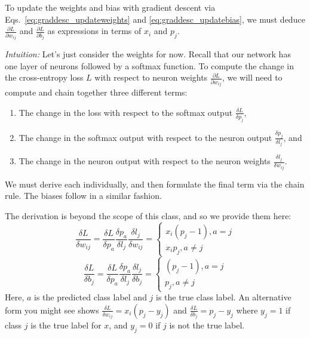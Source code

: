 \documentclass{csci1430}
\begin{document}
To update the weights and bias with gradient descent via Eqs.~\ref{eq:graddesc_updateweights} and \ref{eq:graddesc_updatebias}, we must deduce $\frac{\partial L}{\partial w_{ij}}$ and $\frac{\partial L}{\partial b_j}$ as expressions in terms of $x_i$ and $p_j$.

\emph{Intuition:} Let's just consider the weights for now. Recall that our network has one layer of neurons followed by a softmax function. To compute the change in the cross-entropy loss $L$ with respect to neuron weights $\frac{\partial L}{\partial w_{ij}}$, we will need to compute and chain together three different terms:
\begin{enumerate}
\itemsep0em
\listparindent0em
\topsep0em
\parsep0em
\partopsep0em
\item The change in the loss with respect to the softmax output $\frac{\delta L}{\delta p_j}$,
\item The change in the softmax output with respect to the neuron output $\frac{\delta p_j}{\delta l_j}$, and
\item The change in the neuron output with respect to the neuron weights $\frac{\delta l_j}{\delta w_{ij}}$.
\end{enumerate}
We must derive each individually, and then formulate the final term via the chain rule. The biases follow in a similar fashion.

The derivation is beyond the scope of this class, and so we provide them here:
\begin{equation}
\frac{\delta L}{\delta w_{ij}} = \frac{\delta L}{\delta p_a} \frac{\delta p_a}{\delta l_j} \frac{\delta l_j}{\delta w_{ij}} =\begin{cases}
x_i(p_j-1), a = j\\
x_ip_j,  a\neq j
\end{cases}
\label{eq:wupdate}
\end{equation}
\begin{equation}
\frac{\delta L}{\delta b_j} = \frac{\delta L}{\delta p_a} \frac{\delta p_a}{\delta l_j} \frac{\delta l_j}{\delta b_j} =\begin{cases}
(p_j-1), a = j\\
p_j,  a\neq j
\end{cases}
\label{eq:bupdate}
\end{equation}
Here, $a$ is the predicted class label and $j$ is the true class label. An alternative form you might see shows $\frac{\delta L}{\delta w_{ij}} = x_i(p_j-y_j)$ and $\frac{\delta L}{\delta b_j} = p_j-y_j$ where $y_j=1$ if class $j$ is the true label for $x$, and $y_j = 0$ if $j$ is not the true label.
\end{document}
